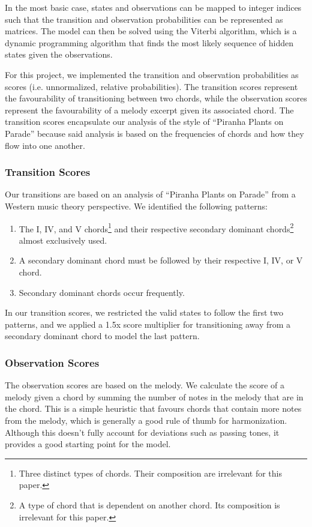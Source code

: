 In the most basic case, states and observations can be mapped to integer indices such that the transition and observation probabilities can be represented as matrices. The model can then be solved using the Viterbi \autocite{HMM:2023} algorithm, which is a dynamic programming algorithm that finds the most likely sequence of hidden states given the observations.

For this project, we implemented the transition and observation probabilities as scores (i.e. unnormalized, relative probabilities). The transition scores represent the favourability of transitioning between two chords, while the observation scores represent the favourability of a melody excerpt given its associated chord. The transition scores encapsulate our analysis of the style of ``Piranha Plants on Parade'' because said analysis is based on the frequencies of chords and how they flow into one another.

\subsubsection{Transition Scores}

Our transitions are based on an analysis of ``Piranha Plants on Parade'' from a Western music theory perspective. We identified the following patterns:
\begin{enumerate}
    \item The I, IV, and V chords\footnote{Three distinct types of chords. Their composition are irrelevant for this paper.} and their respective secondary dominant chords\footnote{A type of chord that is dependent on another chord. Its composition is irrelevant for this paper.} almost exclusively used.
    \item A secondary dominant chord must be followed by their respective I, IV, or V chord.
    \item Secondary dominant chords occur frequently.
\end{enumerate}
In our transition scores, we restricted the valid states to follow the first two patterns, and we applied a 1.5x score multiplier for transitioning away from a secondary dominant chord to model the last pattern.

\subsubsection{Observation Scores}

The observation scores are based on the melody. We calculate the score of a melody given a chord by summing the number of notes in the melody that are in the chord. This is a simple heuristic that favours chords that contain more notes from the melody, which is generally a good rule of thumb for harmonization. Although this doesn't fully account for deviations such as passing tones, it provides a good starting point for the model.
